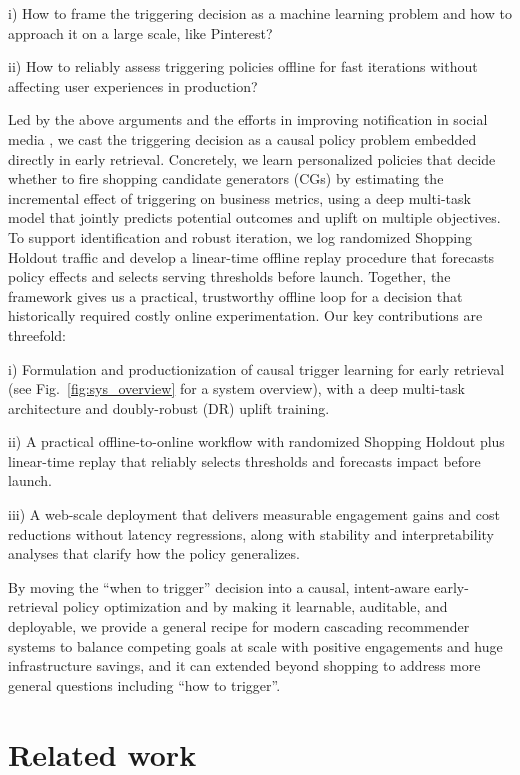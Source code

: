 \documentclass[sigconf, authorversion]{acmart}
\begin{document}
i) How to frame the triggering decision as a machine learning problem and how to approach it on a large scale, like Pinterest?

ii) How to reliably assess triggering policies offline for fast iterations without affecting user experiences in production?

Led by the above arguments and the efforts in improving notification in social media \cite{InsNotif, PinsNotif}, we cast the triggering decision as a causal policy problem embedded directly in early retrieval. Concretely, we learn personalized policies that decide whether to fire shopping candidate generators (CGs) by estimating the incremental effect of triggering on business metrics, using a deep multi-task model that jointly predicts potential outcomes and uplift on multiple objectives. To support identification and robust iteration, we log randomized Shopping Holdout traffic and develop a linear-time offline replay procedure that forecasts policy effects and selects serving thresholds before launch. Together, the framework gives us a practical, trustworthy offline loop for a decision that historically required costly online experimentation. Our key contributions are threefold:

i) Formulation and productionization of causal trigger learning for early retrieval (see Fig.~\ref{fig:sys_overview} for a system overview), with a deep multi-task architecture and doubly-robust (DR) uplift training.

ii) A practical offline-to-online workflow with randomized Shopping Holdout plus linear-time replay that reliably selects thresholds and forecasts impact before launch.

iii) A web-scale deployment that delivers measurable engagement gains and cost reductions without latency regressions, along with stability and interpretability analyses that clarify how the policy generalizes.

By moving the ``when to trigger'' decision into a causal, intent-aware early-retrieval policy optimization and by making it learnable, auditable, and deployable, we provide a general recipe for modern cascading recommender systems to balance competing goals at scale with positive engagements and huge infrastructure savings, and it can extended beyond shopping to address more general questions including ``how to trigger''. 

\section{Related work}
\end{document}
